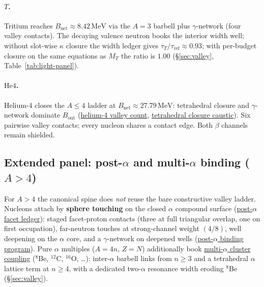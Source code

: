 \documentclass[11pt,notitlepage]{amsart}
\begin{document}
\paragraph{$T$.}
Tritium reaches $B_{\mathrm{net}}\approx 8.42\,\mathrm{MeV}$ via the $A=3$ barbell plus
$\gamma$-network (four valley contacts). The decaying valence neutron books the interior
width well; without slot-wise $\kappa$ closure the width ledger gives
$\tau_T/\tau_{\mathrm{ref}}\approx 0.93$; with per-budget closure on the same equations
as $M_T$ the ratio is $1.00$ (\S\ref{sec:valley}, Table~\ref{tab:light-panel}).

\paragraph{$\mathrm{He4}$.}
Helium-4 closes the $A\le 4$ ladder at $B_{\mathrm{net}}\approx 27.79\,\mathrm{MeV}$:
tetrahedral closure and $\gamma$-network dominate $B_{\mathrm{out}}$
(\hyperref[lean:hqiv-nuclei]{helium-4 valley count},
\hyperref[lean:hqiv-nuclei]{tetrahedral closure caustic}). Six pairwise valley contacts;
every nucleon shares a contact edge. Both $\beta$ channels remain shielded.

\subsection{Extended panel: post-$\alpha$ and multi-$\alpha$ binding ($A>4$)}
\label{sec:extended-panel}

For $A>4$ the canonical spine does \emph{not} reuse the bare constructive valley ladder.
Nucleons attach by \textbf{sphere touching} on the closed $\alpha$ compound surface
(\hyperref[lean:hqiv-nuclei]{post-$\alpha$ facet ledger}): staged facet-proton contacts
(three at full triangular overlap, one on first occupation), far-neutron touches at
strong-channel weight $(4/8)$, well deepening on the $\alpha$ core, and a $\gamma$-network
on deepened wells (\hyperref[script:post-alpha-binding]{post-$\alpha$ binding program}).
Pure $\alpha$ multiples ($A=4n$, $Z=N$) additionally book
\hyperref[script:curvature-binding]{multi-$\alpha$ cluster coupling}
($^8$Be, $^{12}$C, $^{16}$O, \ldots): inter-$\alpha$ barbell links from $n\ge 3$ and a
tetrahedral $\alpha$ lattice term at $n\ge 4$, with a dedicated two-$\alpha$ resonance
width eroding $^8$Be (\S\ref{sec:valley}).
\end{document}

